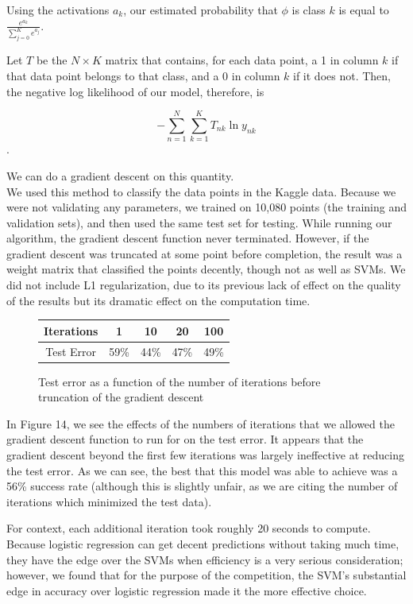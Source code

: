 \documentclass{sigchi}
\begin{document}
Using the activations $a_k$, our estimated probability that $\phi$ is class $k$ is equal to $\frac{e^{a_k}}{\sum_{j=0}^K e^{a_j}}$. 

Let $T$ be the $N \times K$ matrix that contains, for each data point, a 1 in column $k$ if that data point belongs to that class, and a 0 in column $k$ if it does not. Then, the negative log likelihood of our model, therefore, is 

$$-\sum_{n=1}^N \sum_{k=1}^K T_{nk} \ln y_{nk}$$.

We can do a gradient descent on this quantity. \\

We used this method to classify the data points in the Kaggle data. Because we were not validating any parameters, we trained on 10,080 points (the training and validation sets), and then used the same test set for testing. While running our algorithm, the gradient descent function never terminated. However, if the gradient descent was truncated at some point before completion, the result was a weight matrix that classified the points decently, though not as well as SVMs. We did not include L1 regularization, due to its previous lack of effect on the quality of the results but its dramatic effect on the computation time.

\renewcommand*{\arraystretch}{1.5}
\begin{figure}
\centering
	\begin{tabular}{| c | c | c | c | c |}
	\hline
	Iterations & 1 & 10 & 20 & 100 \\
	\hline
	Test Error & 59\% & 44\% & 47\% & 49\% \\
	\hline
	\end{tabular}
	\caption{Test error as a function of the number of iterations before truncation of the gradient descent}
\end{figure}

In Figure 14, we see the effects of the numbers of iterations that we allowed the gradient descent function to run for on the test error. It appears that the gradient descent beyond the first few iterations was largely ineffective at reducing the test error. As we can see, the best that this model was able to achieve was a 56\% success rate (although this is slightly unfair, as we are citing the number of iterations which minimized the test data).

For context, each additional iteration took roughly 20 seconds to compute. Because logistic regression can get decent predictions without taking much time, they have the edge over the SVMs when efficiency is a very serious consideration; however, we found that for the purpose of the competition, the SVM's substantial edge in accuracy over logistic regression made it the more effective choice.
\end{document}
